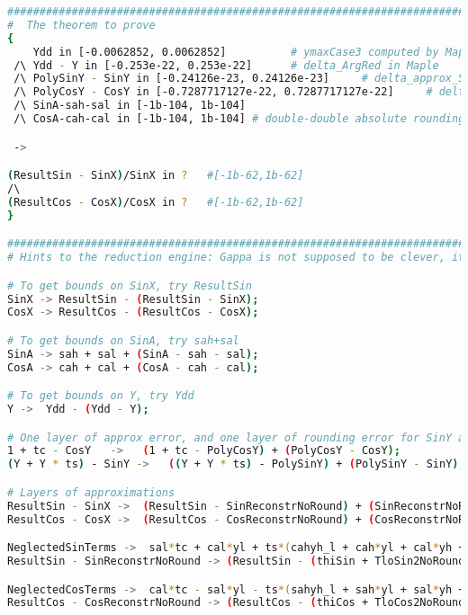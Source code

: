 \begin{lstlisting}[caption={Gappa input to compute the error of DoSineNotZero},
  language={sh}, numbers=none]
###########################################################################################
#  The theorem to prove
{
    Ydd in [-0.0062852, 0.0062852]          # ymaxCase3 computed by Maple
 /\ Ydd - Y in [-0.253e-22, 0.253e-22]      # delta_ArgRed in Maple
 /\ PolySinY - SinY in [-0.24126e-23, 0.24126e-23]     # delta_approx_Sin_Case3
 /\ PolyCosY - CosY in [-0.7287717127e-22, 0.7287717127e-22]     # delta_approx_Cos_Case3
 /\ SinA-sah-sal in [-1b-104, 1b-104] 
 /\ CosA-cah-cal in [-1b-104, 1b-104] # double-double absolute rounding error, with margin

 -> 

(ResultSin - SinX)/SinX in ?   #[-1b-62,1b-62]
/\ 
(ResultCos - CosX)/CosX in ?   #[-1b-62,1b-62]
}

###########################################################################################
# Hints to the reduction engine: Gappa is not supposed to be clever, it's an assistant 

# To get bounds on SinX, try ResultSin
SinX -> ResultSin - (ResultSin - SinX);
CosX -> ResultCos - (ResultCos - CosX);

# To get bounds on SinA, try sah+sal
SinA -> sah + sal + (SinA - sah - sal);
CosA -> cah + cal + (CosA - cah - cal);

# To get bounds on Y, try Ydd
Y ->  Ydd - (Ydd - Y); 

# One layer of approx error, and one layer of rounding error for SinY and CosY
1 + tc - CosY   ->   (1 + tc - PolyCosY) + (PolyCosY - CosY);
(Y + Y * ts) - SinY ->   ((Y + Y * ts) - PolySinY) + (PolySinY - SinY);

# Layers of approximations
ResultSin - SinX ->  (ResultSin - SinReconstrNoRound) + (SinReconstrNoRound - SinReconstrExact) + (SinReconstrExact - SinX);
ResultCos - CosX ->  (ResultCos - CosReconstrNoRound) + (CosReconstrNoRound - CosReconstrExact) + (CosReconstrExact - CosX);

NeglectedSinTerms ->  sal*tc + cal*yl + ts*(cahyh_l + cah*yl + cal*yh + cal*yl); # Should be machine-checked
ResultSin - SinReconstrNoRound -> (ResultSin - (thiSin + TloSin2NoRound)) - (SinReconstrNoRound    -  (thiSin + TloSin2NoRound)) ;

NeglectedCosTerms ->  cal*tc - sal*yl - ts*(sahyh_l + sah*yl + sal*yh + sal*yl); # Should be machine-checked
ResultCos - CosReconstrNoRound -> (ResultCos - (thiCos + TloCos2NoRound)) - (CosReconstrNoRound    -  (thiCos + TloCos2NoRound)) ;
\end{lstlisting}


